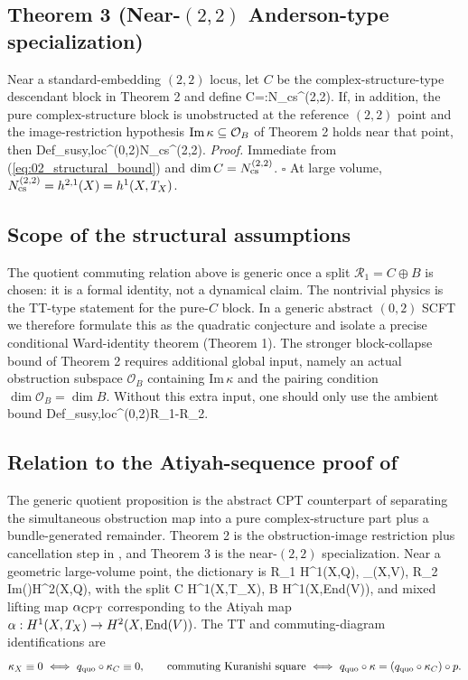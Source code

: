 \documentclass[12pt]{article}
\begin{document}
		\subsection*{Theorem 3 (Near-$(2,2)$ Anderson-type specialization)}
		Near a standard-embedding $(2,2)$ locus, let $C$ be the complex-structure-type descendant block in Theorem 2 and define
		\ie
		\dim C=:N_{\rm cs}^{(2,2)}.
		\fe
		If, in addition, the pure complex-structure block is unobstructed at the reference $(2,2)$ point and the image-restriction hypothesis $\textnormal{Im}\,\kappa\subseteq\mathcal O_B$ of Theorem 2 holds near that point, then
		\ie
		\dim \textnormal{Def}_{\rm susy,loc}^{(0,2)}\ge N_{\rm cs}^{(2,2)}.
		\fe
		\textit{Proof.}
		Immediate from (\ref{eq:02_structural_bound}) and $\dim C=N_{\rm cs}^{(2,2)}$. \hfill$\square$
		At large volume, $N_{\rm cs}^{(2,2)}=h^{2,1}(X)=h^1(X,T_X)$.
		
		\subsection*{Scope of the structural assumptions}
		The quotient commuting relation above is generic once a split $\mathcal R_1=C\oplus B$ is chosen: it is a formal identity, not a dynamical claim. The nontrivial physics is the TT-type statement for the pure-$C$ block. In a generic abstract $(0,2)$ SCFT we therefore formulate this as the quadratic conjecture and isolate a precise conditional Ward-identity theorem (Theorem 1). The stronger block-collapse bound of Theorem 2 requires additional global input, namely an actual obstruction subspace $\mathcal O_B$ containing $\mathrm{Im}\,\kappa$ and the pairing condition $\dim\mathcal O_B=\dim B$. Without this extra input, one should only use the ambient bound
		\ie
		\dim \textnormal{Def}_{\rm susy,loc}^{(0,2)}\ge \dim\mathcal R_1-\dim\mathcal R_2.
		\fe
		
		\subsection*{Relation to the Atiyah-sequence proof of \cite{Anderson:2011ty}}
		The generic quotient proposition is the abstract CPT counterpart of separating the simultaneous obstruction map into a pure complex-structure part plus a bundle-generated remainder. Theorem 2 is the obstruction-image restriction plus cancellation step in \cite{Anderson:2011ty}, and Theorem 3 is the near-$(2,2)$ specialization. Near a geometric large-volume point, the dictionary is
		\ie
		\mathcal R_1 \leftrightarrow H^1(X,\mathcal Q),\qquad
		\kappa \leftrightarrow \kappa_{(X,V)},\qquad
		\mathcal R_2 \leftrightarrow \textnormal{Im}(\rho)\subseteq H^2(X,\mathcal Q),
		\fe
		with the split
		\ie
		C \leftrightarrow H^1(X,T_X),\qquad
		B \leftrightarrow H^1(X,\textnormal{End}(V)),
		\fe
		and mixed lifting map $\alpha_{\rm CPT}$ corresponding to the Atiyah map $\alpha:H^1(X,T_X)\to H^2(X,\textnormal{End}(V))$. The TT and commuting-diagram identifications are
		\[
		\kappa_X\equiv 0\ \Longleftrightarrow\ q_{\rm quo}\circ\kappa_C\equiv 0,
		\qquad
		\textnormal{commuting Kuranishi square}\ \Longleftrightarrow\ q_{\rm quo}\circ\kappa=(q_{\rm quo}\circ\kappa_C)\circ p.
		\]
		
\end{document}
